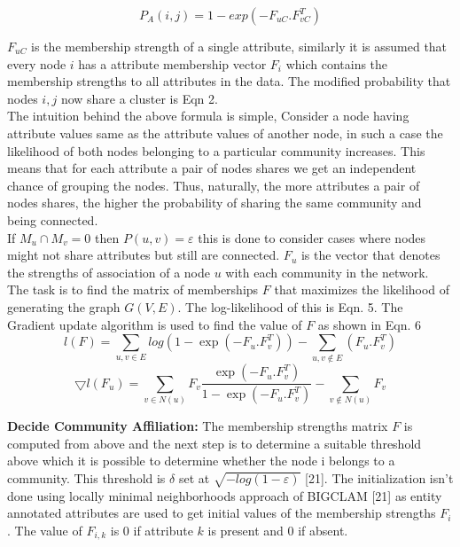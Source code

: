 \documentclass[conference]{IEEEtran}
\begin{document}
\begin{equation}
P_A(i,j) = 1 - exp(-F_{uC}.F_{vC}^T)
\end{equation}

$F_{uC}$ is the membership strength of a single attribute,
similarly it is assumed that every node $i$ has a attribute
membership vector $F_i$ which contains the membership
strengths to all attributes in the data. The modified probability
that nodes $i, j$ now share a cluster is Eqn 2.\\


The intuition behind the above formula is simple, Consider
a node having attribute values same as the attribute values
of another node, in such a case the likelihood of both
nodes belonging to a particular community increases. This
means that for each attribute a pair of nodes shares we
get an independent chance of grouping the nodes. Thus,
naturally, the more attributes a pair of nodes shares, the
higher the probability of sharing the same community and
being connected.\\


 
If $M_u \cap M_v = 0$ then $P(u,v) = ε$ this is done to consider
cases where nodes might not share attributes but still are
connected. $F_u$ is the vector that denotes the strengths of
association of a node $u$ with each community in the network.
The task is to find the matrix of memberships $F$ that
maximizes the likelihood of generating the graph $G(V,E)$.
The log-likelihood of this is Eqn. 5. The Gradient update
algorithm is used to find the value of $F$ as shown in Eqn. 6 \\

\begin{equation}
l(F) = \sum_{u,v \in E} log(1 - \exp(-F_u.F_v^T)) - \sum_{u,v \notin E}(F_u.F_v^T)
\end{equation}
\begin{equation}
\bigtriangledown l(F_u) = \sum_{v \in N(u)} F_v \frac{\exp(-F_u.F_v^T)}{1 - \exp(-F_u.F_v^T)} - \sum_{v \notin N(u)} F_v
\end{equation}

\textbf{Decide Community Affiliation:} The membership strengths
matrix $F$ is computed from above and the next step is to
determine a suitable threshold above which it is possible to
determine whether the node i belongs to a community. This
threshold is $\delta$ set at
$\sqrt{−log(1 - \varepsilon)}$ [21]. The initialization
isn’t done using locally minimal neighborhoods approach of
BIGCLAM [21] as entity annotated attributes are used to get
initial values of the membership strengths $F_i$. The value of
$F_{i,k}$ is 0 if attribute $k$ is present and 0 if absent.\\
\end{document}
